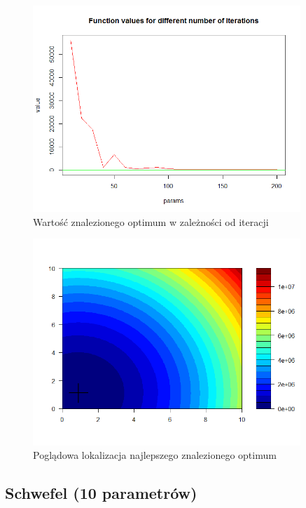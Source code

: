 \documentclass[11pt, a4paper]{article}
\begin{document}
\begin{figure}[H]
	\begin{center}
		\includegraphics[width=0.9\textwidth]{./assets/PriceTransistor6.png} %
		\caption{Wartość znalezionego optimum w zależności od iteracji}
		\label{fig:gulf7}
	\end{center}
\end{figure}
\begin{figure}[H]
	\begin{center}
		\includegraphics[width=0.9\textwidth]{./assets/PriceTransistor7.png} %
		\caption{Poglądowa lokalizacja najlepszego znalezionego optimum}
		\label{fig:gulf7}
	\end{center}
\end{figure}


\subsection{Schwefel (10 parametrów)}
\end{document}

